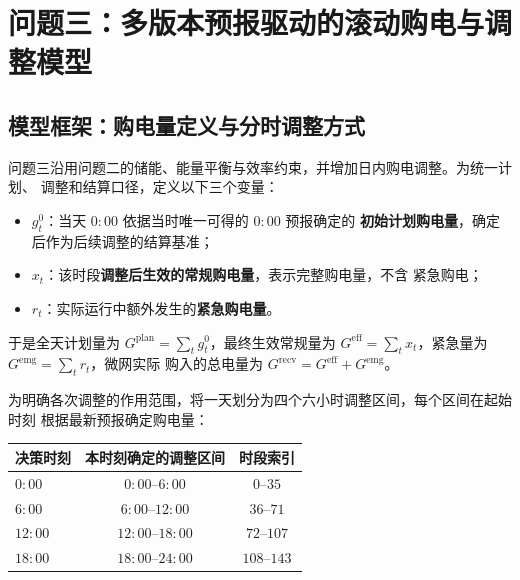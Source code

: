
\section{问题三：多版本预报驱动的滚动购电与调整模型}

\subsection{模型框架：购电量定义与分时调整方式}

问题三沿用问题二的储能、能量平衡与效率约束，并增加日内购电调整。为统一计划、
调整和结算口径，定义以下三个变量：

\begin{itemize}
  \item $g_t^0$：当天 $0{:}00$ 依据当时唯一可得的 $0{:}00$ 预报确定的
        \textbf{初始计划购电量}，确定后作为后续调整的结算基准；
  \item $x_t$：该时段\textbf{调整后生效的常规购电量}，表示完整购电量，不含
        紧急购电；
  \item $r_t$：实际运行中额外发生的\textbf{紧急购电量}。
\end{itemize}

于是全天计划量为 $G^{\mathrm{plan}}=\sum_tg_t^0$，最终生效常规量为
$G^{\mathrm{eff}}=\sum_tx_t$，紧急量为 $G^{\mathrm{emg}}=\sum_tr_t$，微网实际
购入的总电量为 $G^{\mathrm{recv}}=G^{\mathrm{eff}}+G^{\mathrm{emg}}$。

为明确各次调整的作用范围，将一天划分为四个六小时调整区间，每个区间在起始时刻
根据最新预报确定购电量：

\begin{center}
\small
\begin{tabular}{lcc}
  \toprule
  决策时刻 & 本时刻确定的调整区间 & 时段索引 \\
  \midrule
  $0{:}00$  & $0{:}00$--$6{:}00$   & $0$--$35$ \\
  $6{:}00$  & $6{:}00$--$12{:}00$  & $36$--$71$ \\
  $12{:}00$ & $12{:}00$--$18{:}00$ & $72$--$107$ \\
  $18{:}00$ & $18{:}00$--$24{:}00$ & $108$--$143$ \\
  \bottomrule
\end{tabular}
\end{center}

